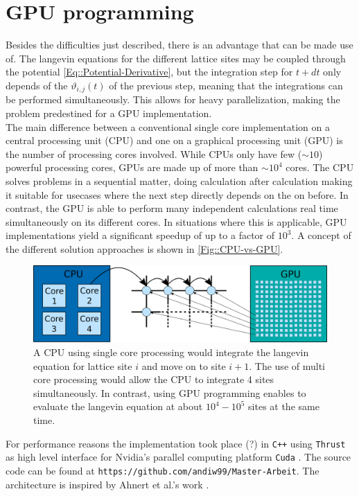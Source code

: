	\section{GPU programming}
	Besides the difficulties just described, there is an advantage that can be made use of. The langevin equations for the different lattice sites may be coupled through the potential \autoref{Eq::Potential-Derivative}, but the integration step for $t + dt$ only depends of the $\vartheta_{i, j}(t)$ of the previous step, meaning that the integrations can be performed simultaneously. This allows for heavy parallelization, making the problem predestined for a GPU implementation. \\
	
	The main difference between a conventional single core implementation on a central processing unit (CPU) and one on a graphical processing unit (GPU) is the number of processing cores involved. While CPUs only have few ($\sim 10$) powerful processing cores, GPUs are made up of more than $\sim 10^4$ cores. The CPU solves problems in a sequential matter, doing calculation after calculation making it suitable for usecases where the next step directly depends on the on before. In contrast, the GPU is able to perform many independent calculations real time simultaneously on its different cores. In situations where this is applicable, GPU implementations yield a significant speedup of up to a factor of $10^3$. A concept of the different solution approaches is shown in \autoref{Fig::CPU-vs-GPU}.\\
	\begin{figure}[htp]
		\centering
		\includegraphics[width=0.8\linewidth]{graphics/CPU-vs-GPU.png}
		\caption{A CPU using single core processing would integrate the langevin equation for lattice site $i$ and move on to site $i+1$. The use of multi core processing would allow the CPU to integrate 4 sites simultaneously. In contrast, using GPU programming enables to evaluate the langevin equation at about $10^4 - 10^5$ sites at the same time.}
		\label{Fig::CPU-vs-GPU}
	\end{figure}

	For performance reasons the implementation took place (?) in \texttt{C++} using \texttt{Thrust} \cite{thrust} as high level interface for Nvidia's parallel computing platform \texttt{Cuda} \cite{cuda}. The source code can be found at \texttt{https://github.com/andiw99/Master-Arbeit}. The architecture is inspired by Ahnert et al.'s work \cite{ahnert2014solving}.
